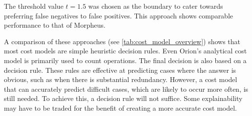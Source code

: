 The threshold value $t = 1.5 $ was chosen as the boundary to cater towards preferring false negatives to false positives. This approach shows comparable performance to that of Morpheus.

A comparison of these approaches (see \autoref{tab:cost_model_overview}) shows that most cost models are simple heuristic decision rules. Even Orion's analytical cost model is primarily used to count operations. The final decision is also based on a decision rule. These rules are effective at predicting cases where the answer is obvious, such as when there is substantial redundancy. However, a cost model that can accurately predict difficult cases, which are likely to occur more often, is still needed. To achieve this, a decision rule will not suffice. Some explainability may have to be traded for the benefit of creating a more accurate cost model.

